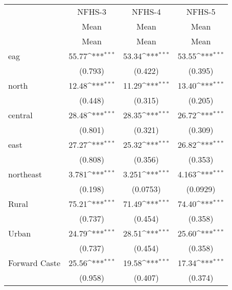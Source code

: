 {
\def\sym#1{\ifmmode^{#1}\else\(^{#1}\)\fi}
\begin{tabular}{l*{3}{c}}
\toprule
                    &      NFHS-3         &      NFHS-4         &      NFHS-5         \\
                    &\multicolumn{1}{c}{Mean}&\multicolumn{1}{c}{Mean}&\multicolumn{1}{c}{Mean}\\
                    &        Mean         &        Mean         &        Mean         \\
\midrule
eag                 &       55.77\sym{***}&       53.34\sym{***}&       53.55\sym{***}\\
                    &     (0.793)         &     (0.422)         &     (0.395)         \\
\addlinespace
north               &       12.48\sym{***}&       11.29\sym{***}&       13.40\sym{***}\\
                    &     (0.448)         &     (0.315)         &     (0.205)         \\
\addlinespace
central             &       28.48\sym{***}&       28.35\sym{***}&       26.72\sym{***}\\
                    &     (0.801)         &     (0.321)         &     (0.309)         \\
\addlinespace
east                &       27.27\sym{***}&       25.32\sym{***}&       26.82\sym{***}\\
                    &     (0.808)         &     (0.356)         &     (0.353)         \\
\addlinespace
northeast           &       3.781\sym{***}&       3.251\sym{***}&       4.163\sym{***}\\
                    &     (0.198)         &    (0.0753)         &    (0.0929)         \\
\addlinespace
Rural               &       75.21\sym{***}&       71.49\sym{***}&       74.40\sym{***}\\
                    &     (0.737)         &     (0.454)         &     (0.358)         \\
\addlinespace
Urban               &       24.79\sym{***}&       28.51\sym{***}&       25.60\sym{***}\\
                    &     (0.737)         &     (0.454)         &     (0.358)         \\
\addlinespace
Forward Caste       &       25.56\sym{***}&       19.58\sym{***}&       17.34\sym{***}\\
                    &     (0.958)         &     (0.407)         &     (0.374)         \\

\end{tabular}}
